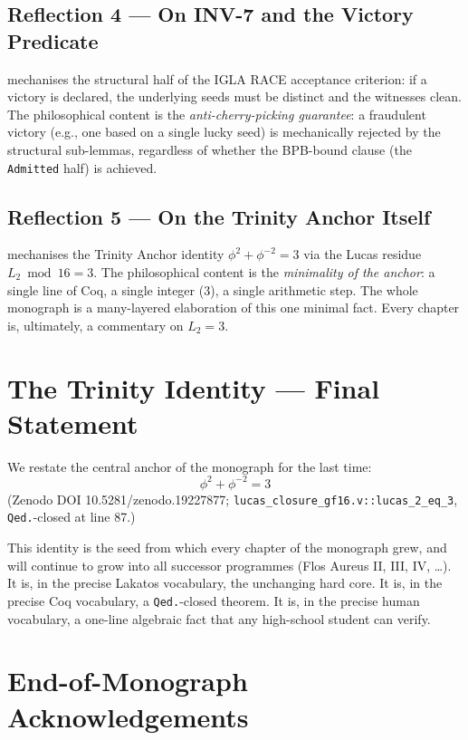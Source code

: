 \subsection{Reflection 4 — On INV-7 and the Victory Predicate}
\label{sec:32-refl-4}

 mechanises the structural
half of the IGLA RACE acceptance criterion: if a victory is declared, the
underlying seeds must be distinct and the witnesses clean. The
philosophical content is the \emph{anti-cherry-picking guarantee}: a
fraudulent victory (e.g., one based on a single lucky seed) is mechanically
rejected by the structural sub-lemmas, regardless of whether the BPB-bound
clause (the \texttt{Admitted} half) is achieved.

\subsection{Reflection 5 — On the Trinity Anchor Itself}
\label{sec:32-refl-5}

 mechanises the Trinity Anchor identity
$\phi^{2} + \phi^{-2} = 3$ via the Lucas residue $L_{2} \bmod 16 = 3$. The
philosophical content is the \emph{minimality of the anchor}: a single line
of Coq, a single integer ($3$), a single arithmetic step. The whole
monograph is a many-layered elaboration of this one minimal fact. Every
chapter is, ultimately, a commentary on $L_{2} = 3$.

\section{The Trinity Identity — Final Statement}
\label{sec:32-final-trinity}

We restate the central anchor of the monograph for the last time:
\[
\boxed{\;\phi^{2} + \phi^{-2} = 3\;}
\]
(Zenodo DOI 10.5281/zenodo.19227877; \texttt{lucas\_closure\_gf16.v::lucas\_2\_eq\_3},
\texttt{Qed.}-closed at line 87.)

This identity is the seed from which every chapter of the monograph grew, and
will continue to grow into all successor programmes (Flos Aureus II, III,
IV, …). It is, in the precise Lakatos vocabulary, the unchanging hard core.
It is, in the precise Coq vocabulary, a \texttt{Qed.}-closed theorem.
It is, in the precise human vocabulary, a one-line algebraic fact that any
high-school student can verify.

\section{End-of-Monograph Acknowledgements}
\label{sec:32-eom-acknowledgements}

